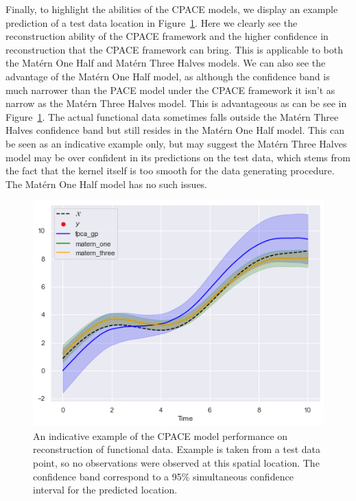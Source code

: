 Finally, to highlight the abilities of the CPACE models, we display an example prediction of a test data location in Figure~\ref{fig:test_ex_B}.
Here we clearly see the reconstruction ability of the CPACE framework and the higher confidence in reconstruction that the CPACE framework can bring.
This is applicable to both the Mat\'ern One Half and Mat\'ern Three Halves models.
We can also see the advantage of the Mat\'ern One Half model, as although the confidence band is much narrower than the PACE model under the CPACE framework it isn't as narrow as the Mat\'ern Three Halves model.
This is advantageous as can be see in Figure~\ref{fig:test_ex_B}.
The actual functional data sometimes falls outside the Mat\'ern Three Halves confidence band but still resides in the Mat\'ern One Half model.
This can be seen as an indicative example only, but may suggest the Mat\'ern Three Halves model may be over confident in its predictions on the test data, which stems from the fact that the kernel itself is too smooth for the data generating procedure. 
The Mat\'ern One Half model has no such issues.

\begin{figure}
	\centering
	\includegraphics[width=\textwidth]{test_ex_B}
	\caption{An indicative example of the CPACE model performance on reconstruction of functional data. Example is taken from a test data point, so no observations were observed at this spatial location. The confidence band correspond to a 95\% simultaneous confidence interval for the predicted location.}
	\label{fig:test_ex_B}
\end{figure}


